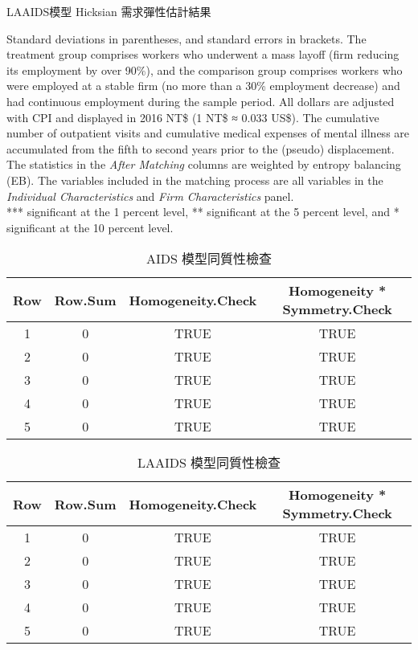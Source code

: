 \begin{table}[H]
    \caption{LAAIDS模型 Hicksian 需求彈性估計結果} \label{laaids_hicks}
    \center
    \footnotesize
    
\end{table}
\vspace{-2em}
\begin{singlespace}
    \begin{footnotesize}
     Standard deviations in parentheses, and standard errors in brackets. The treatment group comprises workers who underwent a mass layoff (firm reducing its employment by over 90\%), and the comparison group comprises workers who were employed at a stable firm (no more than a 30\% employment decrease) and had continuous employment during the sample period. All dollars are adjusted with CPI and displayed in 2016 NT\$ (1 NT\$ ≈ 0.033 US\$). The cumulative number of outpatient visits and cumulative medical expenses of mental illness are accumulated from the fifth to second years prior to the (pseudo) displacement. The statistics in the {\it After Matching} columns are weighted by entropy balancing (EB). The variables included in the matching process are all variables in the {\it Individual Characteristics} and {\it Firm Characteristics} panel. \\
    *** significant at the 1 percent level, ** significant at the 5 percent level, and * significant at the 10 percent level.
    \end{footnotesize}
\end{singlespace}


\begin{table}[H]
    \centering
    \caption{AIDS 模型同質性檢查} \label{aids-homo}
    \begin{tabular}{cccc}
        \toprule
        Row & Row.Sum & Homogeneity.Check & Homogeneity * Symmetry.Check \\
        \midrule
        1 & 0 & TRUE & TRUE \\
        2 & 0 & TRUE & TRUE \\
        3 & 0 & TRUE & TRUE \\
        4 & 0 & TRUE & TRUE \\
        5 & 0 & TRUE & TRUE \\
        \bottomrule
    \end{tabular}
\end{table}

\begin{table}[H]
    \centering
    \caption{LAAIDS 模型同質性檢查} \label{laaids-homo}
    \begin{tabular}{cccc}
        \toprule
        Row & Row.Sum & Homogeneity.Check & Homogeneity * Symmetry.Check \\
        \midrule
        1 & 0 & TRUE & TRUE \\
        2 & 0 & TRUE & TRUE \\
        3 & 0 & TRUE & TRUE \\
        4 & 0 & TRUE & TRUE \\
        5 & 0 & TRUE & TRUE \\
        \bottomrule
    \end{tabular}
\end{table}

